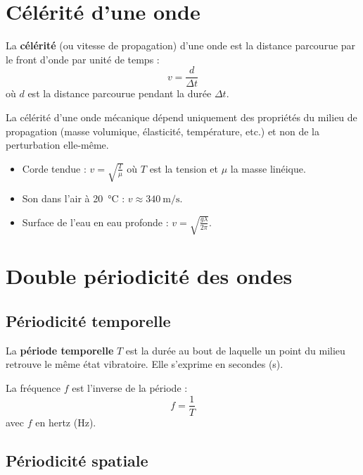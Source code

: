 \section{Célérité d'une onde}

\begin{definition}[Célérité]
La \textbf{célérité} (ou vitesse de propagation) d'une onde est la distance parcourue par le front d'onde par unité de temps :
\[
v = \frac{d}{\Delta t}
\]
où $d$ est la distance parcourue pendant la durée $\Delta t$.
\end{definition}

\begin{propriete}
La célérité d'une onde mécanique dépend uniquement des propriétés du milieu de propagation (masse volumique, élasticité, température, etc.) et non de la perturbation elle-même.
\end{propriete}

\begin{exemple}
\begin{itemize}
    \item Corde tendue : $v = \sqrt{\frac{T}{\mu}}$ où $T$ est la tension et $\mu$ la masse linéique.
    \item Son dans l'air à \SI{20}{\celsius} : $v \approx \SI{340}{\metre\per\second}$.
    \item Surface de l'eau en eau profonde : $v = \sqrt{\frac{g\lambda}{2\pi}}$.
\end{itemize}
\end{exemple}

\section{Double périodicité des ondes}

\subsection{Périodicité temporelle}

\begin{definition}
La \textbf{période temporelle} $T$ est la durée au bout de laquelle un point du milieu retrouve le même état vibratoire. Elle s'exprime en secondes (\si{\second}).
\end{definition}

La fréquence $f$ est l'inverse de la période :
\[
f = \frac{1}{T}
\]
avec $f$ en hertz (\si{\hertz}).

\subsection{Périodicité spatiale}

